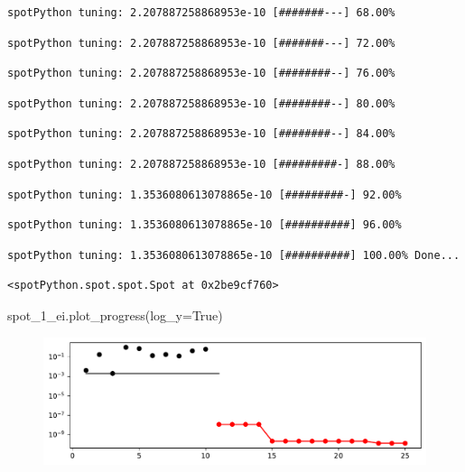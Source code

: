 \documentclass[
  letterpaper,
  DIV=11,
  numbers=noendperiod]{scrreprt}
\newenvironment{Shaded}{\begin{snugshade}}{\end{snugshade}}
\newcommand{\NormalTok}[1]{\textcolor[rgb]{0.00,0.23,0.31}{#1}}
\newcommand{\OperatorTok}[1]{\textcolor[rgb]{0.37,0.37,0.37}{#1}}
\newcommand{\VariableTok}[1]{\textcolor[rgb]{0.07,0.07,0.07}{#1}}
\begin{document}
\begin{verbatim}
spotPython tuning: 2.207887258868953e-10 [#######---] 68.00% 
\end{verbatim}

\begin{verbatim}
spotPython tuning: 2.207887258868953e-10 [#######---] 72.00% 
\end{verbatim}

\begin{verbatim}
spotPython tuning: 2.207887258868953e-10 [########--] 76.00% 
\end{verbatim}

\begin{verbatim}
spotPython tuning: 2.207887258868953e-10 [########--] 80.00% 
\end{verbatim}

\begin{verbatim}
spotPython tuning: 2.207887258868953e-10 [########--] 84.00% 
\end{verbatim}

\begin{verbatim}
spotPython tuning: 2.207887258868953e-10 [#########-] 88.00% 
\end{verbatim}

\begin{verbatim}
spotPython tuning: 1.3536080613078865e-10 [#########-] 92.00% 
\end{verbatim}

\begin{verbatim}
spotPython tuning: 1.3536080613078865e-10 [##########] 96.00% 
\end{verbatim}

\begin{verbatim}
spotPython tuning: 1.3536080613078865e-10 [##########] 100.00% Done...
\end{verbatim}

\begin{verbatim}
<spotPython.spot.spot.Spot at 0x2be9cf760>
\end{verbatim}

\begin{Shaded}
\begin{Highlighting}[]
\NormalTok{spot\_1\_ei.plot\_progress(log\_y}\OperatorTok{=}\VariableTok{True}\NormalTok{)}
\end{Highlighting}
\end{Shaded}

\begin{figure}[H]

{\centering \includegraphics{07_spot_ei_files/figure-pdf/cell-11-output-1.pdf}

}

\end{figure}
\end{document}
